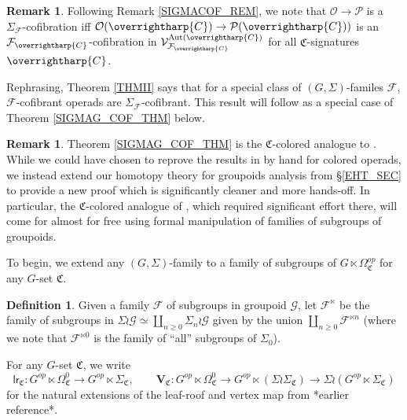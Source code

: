 \documentclass[a4paper,10pt
,draft
]{article}%
\numberwithin{equation}{section}
\numberwithin{figure}{section}
\theoremstyle{definition} %
\newtheorem{definition}[equation]{Definition}%
\newtheorem{remark}[equation]{Remark}%
\newcommand{\vect}[1]{\text{\overrightharp{\ensuremath{#1}}}}
\DeclareMathOperator{\Aut}{Aut}%
\newcommand{\F}{\ensuremath{\mathcal F}}
\newcommand{\V}{\ensuremath{\mathcal V}}
\renewcommand{\O}{\ensuremath{\mathcal O}}
\renewcommand{\P}{\ensuremath{\mathcal P}}
\newcommand{\G}{\ensuremath{\mathcal G}}
\newcommand{\1}{\ensuremath{\mathbbm 1}}%
\begin{document}
\begin{remark}
      Following Remark \ref{SIGMACOF_REM}, we note that 
      $\O \to \P$ is a $\Sigma_\F$-cofibration iff 
      $\O(\vect C) \to \P(\vect C))$ is an $\mathcal F_{\vect C}$-cofibration in $\V^{\Aut(\vect C)}_{\F_{\vect  C}}$
      for all $\mathfrak C$-signatures $\vect C$.
\end{remark}     

Rephrasing, Theorem \ref{THMII} says that for a special class of $(G,\Sigma)$-familes $\F$, $\F$-cofibrant operads are $\Sigma_\F$-cofibrant.
This result will follow as a special case of Theorem \ref{SIGMAG_COF_THM} below.

\begin{remark}
      Theorem \ref{SIGMAG_COF_THM} is the $\mathfrak C$-colored analogue to \cite[{Remark 6.64, after Theorem 6.59}]{BP_geo}.
      While we could have chosen to reprove the results in \cite[\S 6]{BP_geo} by hand for colored operads,
      we instead extend our homotopy theory for groupoids analysis from \S \ref{EHT_SEC} to provide a
      new proof which is significantly cleaner and more hands-off.
      In particular, the $\mathfrak C$-colored analogue of \cite[Prop. 6.52]{BP_geo}, which required significant effort there,
      will come for almost for free using formal manipulation of families of subgroups of groupoids.
\end{remark}

To begin, we extend any $(G,\Sigma)$-family to a family of subgroups of $G \ltimes \Omega_{\mathfrak C}^{op}$ for any $G$-set $\mathfrak C$.

\begin{definition}
      Given a family 
      $\F$ of subgroups in groupoid $\G$,
      let $\F^{\ltimes}$
      be the family of subgroups in
      $\Sigma \wr \G \simeq \coprod_{n \geq 0} \Sigma_{n} \wr \G$
      given by the union 
      $\coprod_{n \geq 0} \F^{\ltimes n}$
      (where we note that $\F^{\ltimes 0}$ is the family of ``all'' subgroups of $\Sigma_0$).
\end{definition}

For any $G$-set $\mathfrak C$, we write  
\begin{equation}
      \label{LRCVC_EQ}
      \mathsf{lr}_{\mathfrak{C}} \colon 
      G^{op} \ltimes \Omega^0_{\mathfrak{C}}
      \to
      G^{op} \ltimes \Sigma_{\mathfrak{C}},
      \qquad
      \boldsymbol{V}_{\mathfrak{C}} \colon 
      G^{op} \ltimes \Omega^0_{\mathfrak{C}}
      \to
      G^{op} \ltimes (\Sigma \wr \Sigma_{\mathfrak{C}})
      \to
      \Sigma \wr  (G^{op}  \ltimes \Sigma_{\mathfrak{C}})
\end{equation}
for the natural extensions of the leaf-roof and vertex map {\color{blue} from *earlier reference*}.
\end{document}
